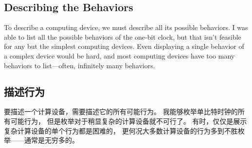 % 

\begin{en}
\subsection{Describing the Behaviors}

To describe a computing device, we must describe all its possible
behaviors.  I was able to list all the possible behaviors of the
one-bit clock, but that isn't feasible for any but the simplest
computing devices.  Even displaying a single behavior of a complex
device would be hard, and most computing devices have too many
behaviors to list---often, infinitely many behaviors.
\end{en}

\begin{ch}
  \subsection{描述行为}
  要描述一个计算设备，需要描述它的所有可能行为。
  我能够枚举单比特时钟的所有可能行为，
  但是枚举对于稍显复杂的计算设备就不可行了。
  有时，仅仅是展示复杂计算设备的单个行为都是困难的，
  更何况大多数计算设备的行为多到不胜枚举——通常是无穷多的。
\end{ch}

